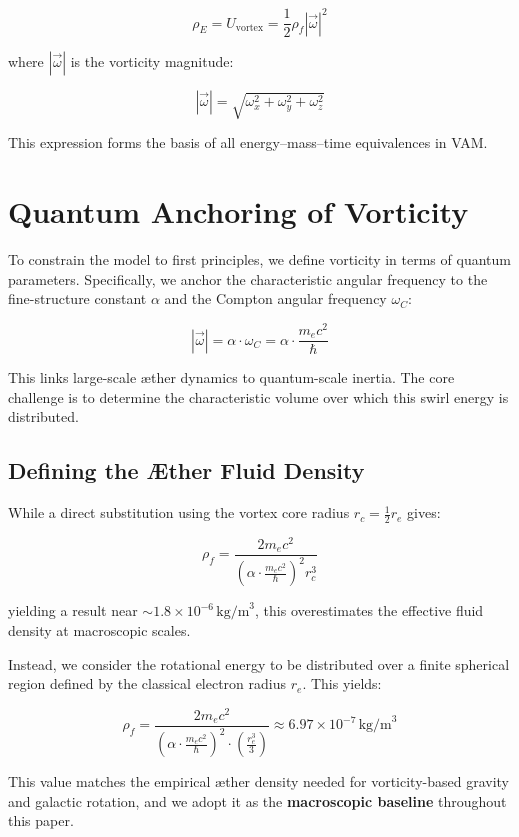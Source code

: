 \documentclass[12pt]{article}
\begin{document}
    \[
        \rho_{\scriptscriptstyle\boldsymbol\!E} = U_{\text{vortex}} = \frac{1}{2} \rho_{\!f} |\vec{\omega}|^2
    \]

    where \( |\vec{\omega}| \) is the vorticity magnitude:

    \[
        |\vec{\omega}| = \sqrt{\omega_x^2 + \omega_y^2 + \omega_z^2}
    \]

    This expression forms the basis of all energy–mass–time equivalences in VAM.

    \section{Quantum Anchoring of Vorticity}

    To constrain the model to first principles, we define vorticity in terms of quantum parameters. Specifically, we anchor the characteristic angular frequency to the fine-structure constant \( \alpha \) and the Compton angular frequency \( \omega_C \):

    \[
        |\vec{\omega}| = \alpha \cdot \omega_C = \alpha \cdot \frac{m_e c^2}{\hbar}
    \]

    This links large-scale æther dynamics to quantum-scale inertia. The core challenge is to determine the characteristic volume over which this swirl energy is distributed.

    \subsection{Defining the Æther Fluid Density}

    While a direct substitution using the vortex core radius \( r_c = \frac{1}{2} r_e \) gives:

    \[
        \rho_{\!f} = \frac{2 m_e c^2}{\left(\alpha \cdot \frac{m_e c^2}{\hbar}\right)^2 r_c^3}
    \]

    yielding a result near \( \sim 1.8 \times 10^{-6} \, \text{kg/m}^3 \), this overestimates the effective fluid density at macroscopic scales.

    Instead, we consider the rotational energy to be distributed over a finite spherical region defined by the classical electron radius \( r_e \). This yields:

    \[
        \rho_{\!f} = \frac{2 m_e c^2}{\left(\alpha \cdot \frac{m_e c^2}{\hbar}\right)^2 \cdot \left(\frac{r_e^3}{3}\right)} \approx 6.97 \times 10^{-7} \, \text{kg/m}^3
    \]

    This value matches the empirical æther density needed for vorticity-based gravity and galactic rotation, and we adopt it as the \textbf{macroscopic baseline} throughout this paper.
\end{document}
